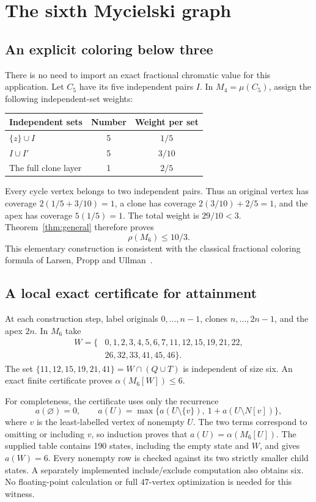 \documentclass[11pt,letterpaper]{article}
\theoremstyle{remark}
\begin{document}
\section{The sixth Mycielski graph}\label{sec:M6}
\subsection{An explicit coloring below three}
There is no need to import an exact fractional chromatic value for this
application. Let $C_5$ have its five independent pairs $I$. In
$M_4=\mu(C_5)$, assign the following independent-set weights:
\begin{center}
\begin{tabular}{@{}lcc@{}}
\toprule
Independent sets & Number & Weight per set\\
\midrule
$\{z\}\cup I$ & 5 & $1/5$\\
$I\cup I'$ & 5 & $3/10$\\
The full clone layer & 1 & $2/5$\\
\bottomrule
\end{tabular}
\end{center}
Every cycle vertex belongs to two independent pairs. Thus an original
vertex has coverage $2(1/5+3/10)=1$, a clone has coverage
$2(3/10)+2/5=1$, and the apex has coverage $5(1/5)=1$.
The total weight is $29/10<3$. Theorem~\ref{thm:general} therefore proves
\begin{equation}\label{eq:M6upper}
 \rho(M_6)\le10/3.
\end{equation}
This elementary construction is consistent with the classical fractional
coloring formula of Larsen, Propp and Ullman~\cite{LPU}.

\subsection{A local exact certificate for attainment}
At each construction step, label originals $0,\ldots,n-1$, clones
$n,\ldots,2n-1$, and the apex $2n$. In $M_6$ take
\begin{align*}
 W=\{&0,1,2,3,4,5,6,7,11,12,15,19,21,22,\\
     &26,32,33,41,45,46\}.
\end{align*}
The set $\{11,12,15,19,21,41\}=W\cap(Q\cup T)$ is independent of size six.
An exact finite certificate proves $\alpha(M_6[W])\le6$.

For completeness, the certificate uses only the recurrence
\begin{equation}\label{eq:alpharec}
 a(\varnothing)=0,\qquad
 a(U)=\max\{a(U\setminus\{v\}),\ 1+a(U\setminus N[v])\},
\end{equation}
where $v$ is the least-labelled vertex of nonempty $U$. The two terms
correspond to omitting or including $v$, so induction proves that
$a(U)=\alpha(M_6[U])$. The supplied table contains 190 states, including
the empty state and $W$, and gives $a(W)=6$. Every nonempty row is checked
against its two strictly smaller child states. A separately implemented
include/exclude computation also obtains six. No floating-point
calculation or full $47$-vertex optimization is needed for this witness.
\end{document}
